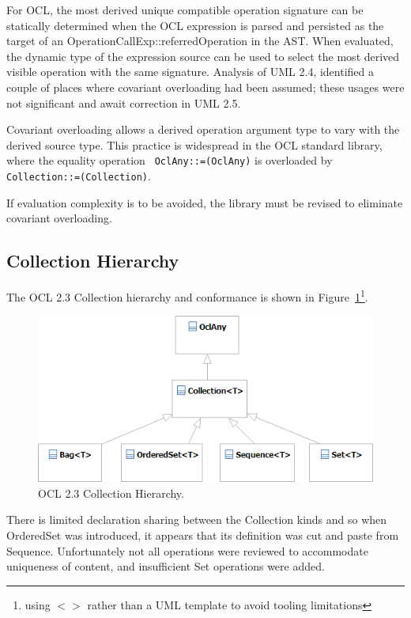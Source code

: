 \documentclass{eceasst}
\begin{document}
For OCL, the most derived unique compatible operation signature can be statically determined when the OCL expression is parsed and persisted as the target of an OperationCallExp::referredOperation in the AST. When evaluated, the dynamic type of the expression source can be used to select the most derived visible operation with the same signature. Analysis of UML 2.4, identified a couple of places where covariant overloading had been assumed; these usages were not significant and await correction in UML 2.5.

Covariant overloading allows a derived operation argument type to vary with the derived source type. This practice is widespread in the OCL standard library, where the equality operation \verb| OclAny::=(OclAny)| is overloaded by \verb|Collection::=(Collection)|.

If evaluation complexity is to be avoided, the library must be revised to eliminate covariant overloading.

\subsection{Collection Hierarchy}

The OCL 2.3 Collection hierarchy and conformance is shown in Figure~\ref{fig:Collections_2_2}\footnote{using $< >$ rather than a UML template to avoid tooling limitations}.

\begin{figure}
  \begin{center}
    \includegraphics[width=5.0in]{Collections_2_2.png}
  \end{center}
  \caption{OCL 2.3 Collection Hierarchy.}
  \label{fig:Collections_2_2}
\end{figure}

There is limited declaration sharing between the Collection kinds and so when OrderedSet was introduced, it appears that its definition was cut and paste from Sequence. Unfortunately not all operations were reviewed to accommodate uniqueness of content, and insufficient Set operations were added. 
\end{document}
